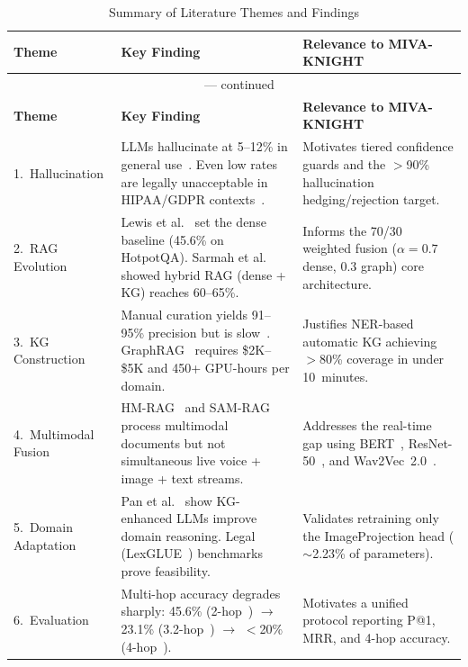 \documentclass[12pt, a4paper]{article}
\begin{document}
\begin{longtable}{@{}p{2.0cm} p{4.8cm} p{5.0cm}@{}}
\caption{Summary of Literature Themes and Findings}
\label{tab:themes}\\
\toprule
\textbf{Theme} & \textbf{Key Finding} & \textbf{Relevance to MIVA-KNIGHT} \\
\midrule
\endfirsthead
\multicolumn{3}{c}{\tablename\ \thetable{} --- continued}\\
\toprule
\textbf{Theme} & \textbf{Key Finding} & \textbf{Relevance to MIVA-KNIGHT} \\
\midrule
\endhead
\bottomrule
\endfoot

1.~Hallucination
  & LLMs hallucinate at 5--12\% in general
    use~\cite{zhang2023sirens,ji2023survey}. Even low rates are legally
    unacceptable in HIPAA/GDPR contexts~\cite{tang2024multihop}.
  & Motivates tiered confidence guards and the $>$90\% hallucination
    hedging/rejection target. \\[6pt]

2.~RAG Evolution
  & Lewis et al.~\cite{lewis2020rag} set the dense baseline (45.6\% on
    HotpotQA). Sarmah et al.~\cite{sarmah2024hybridrag} showed hybrid RAG
    (dense + KG) reaches 60--65\%.
  & Informs the 70/30 weighted fusion ($\alpha{=}0.7$ dense, $0.3$ graph)
    core architecture. \\[6pt]

3.~KG Construction
  & Manual curation yields 91--95\% precision but is
    slow~\cite{rossiello2023knowledge}. GraphRAG~\cite{edge2024graphrag}
    requires \$2K--\$5K and 450+ GPU-hours per domain.
  & Justifies NER-based automatic KG achieving $>$80\% coverage in under
    10~minutes. \\[6pt]

4.~Multimodal Fusion
  & HM-RAG~\cite{liu2025hmrag} and SAM-RAG~\cite{zhai2024samrag} process
    multimodal documents but not simultaneous live voice + image + text
    streams.
  & Addresses the real-time gap using BERT~\cite{devlin2019bert},
    ResNet-50~\cite{he2016deep}, and Wav2Vec~2.0~\cite{baevski2020wav2vec}. \\[6pt]

5.~Domain Adaptation
  & Pan et al.~\cite{pan2024unifying} show KG-enhanced LLMs improve domain
    reasoning. Legal (LexGLUE~\cite{chalkidis2022lexglue}) benchmarks prove
    feasibility.
  & Validates retraining only the ImageProjection head ($\sim$2.23\% of
    parameters). \\[6pt]

6.~Evaluation
  & Multi-hop accuracy degrades sharply: 45.6\%
    (2-hop~\cite{yang2018hotpotqa}) $\to$ 23.1\%
    (3.2-hop~\cite{trivedi2022musique}) $\to$ $<$20\%
    (4-hop~\cite{tang2024multihop}).
  & Motivates a unified protocol reporting P@1, MRR, and 4-hop accuracy. \\

\end{longtable}
\end{document}

